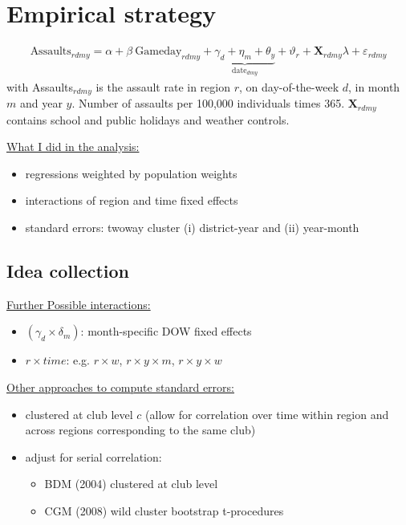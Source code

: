 \documentclass[11pt, a4paper, draft]{article} %
\begin{document}
\newpage
\section{Empirical strategy}\label{sec_soc_ext:empirical_strategy}




\begin{align}
	\text{Assaults}_{rdmy} = \alpha + \beta\ \text{Gameday}_{rdmy} + \underbrace{\gamma_d +  \eta_m + \theta_y}_{\text{date}_{dmy}} + \vartheta_r + \mathbf{X}_{rdmy} \lambda + \varepsilon_{rdmy}
	\label{eq_soc_ext:model}
\end{align}
with Assaults$_{rdmy}$ is the assault rate in region $r$, on day-of-the-week $d$, in month $m$ and year $y$. Number of assaults per 100,000 individuals times 365. $\mathbf{X}_{rdmy}$ contains school and public holidays and weather controls.\newline

\underline{What I did in the analysis:} 
\begin{itemize}
	\item regressions weighted by population weights
	\item interactions of region and time fixed effects
	\item standard errors: twoway cluster (i) district-year and (ii) year-month
\end{itemize}



\subsection{Idea collection}
\underline{Further Possible interactions:} 
\begin{itemize}
	\item $(\gamma_d \times \delta_m)$: month-specific DOW fixed effects
	\item $r \times time$: e.g. $r \times w$, $r \times y \times m$,  $r \times y \times w$
\end{itemize}

\underline{Other approaches to compute standard errors:}
\begin{itemize}
	\item clustered at club level $c$ (allow for correlation over time within region and across regions corresponding to the same club)

	\item adjust for serial correlation: 
	\begin{itemize}
		\item BDM (2004) clustered at club level
		\item CGM (2008) wild cluster bootstrap t-procedures
	\end{itemize}
\end{itemize}
\end{document}
